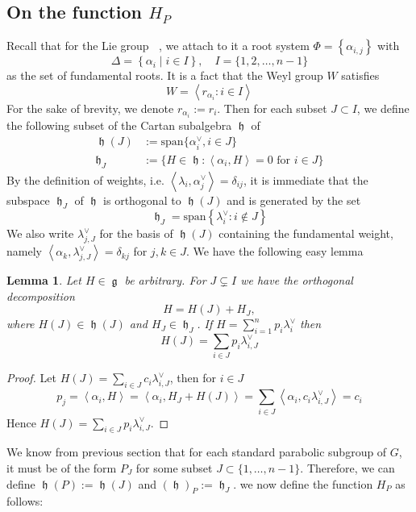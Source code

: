 \documentclass[12pt]{article} %
\newtheorem{lemma}[definition]{Lemma}
\DeclareMathOperator{\SLn}{\text{SL}_n(\mathbb{R})}
\DeclareMathOperator{\fg}{\mathfrak{g}}
\DeclareMathOperator{\fh}{\mathfrak{h}}
\DeclareMathOperator{\slnr}{\mathfrak{sl}_n(\mathbb{R})}
\begin{document}
\subsection{On the function $H_P$}
Recall that for the Lie group $\SLn$, we attach to it a root system $\Phi = \left\lbrace \alpha_{i,j}\right\rbrace$ with
\[\Delta = \left\lbrace \alpha_i\mid i \in I \right\rbrace, \quad I = \{1,2,\ldots,n-1\}\]
as the set of fundamental roots. It is a fact that the Weyl group $W$ satisfies
\[W = \left\langle r_{\alpha_i}: i \in I \right\rangle\]
For the sake of brevity, we denote $r_{\alpha_i}:=r_i$. Then for each subset $J \subset I$,
we define the following subset of the Cartan subalgebra $\fh$ of $\slnr$
\begin{align*}
    \fh(J) & :=\text{span}\{ \alpha^\vee_i, i \in J\}                                       \\
    \fh_J  & := \{H \in \fh: \left\langle \alpha_i,H\right\rangle=0 \mbox{ for } i \in J \}
\end{align*}
By the definition of weights, i.e. $\left\langle \lambda_i,\alpha^\vee_j \right\rangle = \delta_{ij}$, it is immediate
that the subspace $\fh_J$ of $\fh$ is orthogonal to $\fh(J)$ and is generated by the set
\[\fh_J = \text{span}\left\lbrace \lambda^\vee_i: i \notin J\right\rbrace \]
We also write $\lambda^{\vee}_{j,J}$ for the basis of $\fh(J)$ containing the fundamental
weight, namely $\left\langle \alpha_k,\lambda^{\vee}_{j,J}\right\rangle = \delta_{kj}$ for $j,k \in J$. We have
the following easy lemma
\begin{lemma}\label{coeff-H(J)}
    Let $H \in \fg$ be arbitrary. For $J \subsetneq I$ we have the orthogonal decomposition
    \[H = H(J)+H_J,\]
    where $H(J) \in \fh(J)$ and $H_J \in \fh_J$. If $H = \sum_{i=1}^n p_i\lambda^\vee_i$ then
    \[H(J) = \sum_{i \in J} p_i \lambda^\vee_{i,J}\]
\end{lemma}
\begin{proof}
    Let $H(J) = \sum_{i \in J} c_i \lambda^\vee_{i,J}$, then for $i \in J$
    \[p_j = \left\langle \alpha_i,H \right\rangle =\left\langle \alpha_i,H_J+H(J) \right\rangle = \sum_{i \in J}\left\langle \alpha_i,  c_i \lambda^\vee_{i,J}\right\rangle=c_i \]
    Hence $H(J) = \sum_{i \in J} p_i \lambda^\vee_{i,J}$.
\end{proof}
We know from previous section that for each standard parabolic subgroup of $G$, it must be of the form
$P_J$ for some subset $J \subset \{1,\ldots,n-1\}$. Therefore, we can define $\fh(P):= \fh(J)$ and $
    (\fh)_P:= \fh_J$. we now define the function $H_P$ as follows:
\end{document}
